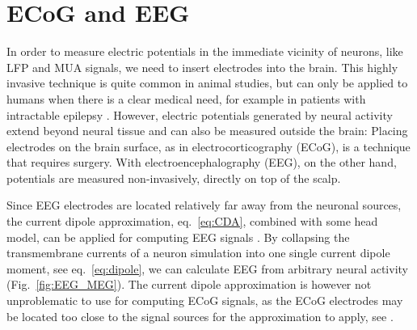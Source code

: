 \documentclass[preprint,11pt,authoryear]{elsarticle}
\newcommand{\hlj}[2][OliveGreen]{ {\sethlcolor{#1} \hl{#2}} }
\newcommand{\hlp}[2][Purple]{ {\sethlcolor{#1} \hl{#2}} }
\newcommand{\tvnnote}[1]{\color{white}{\hlj{TVN: #1 }}\color{black}}
\newcommand{\snnote}[1]{\color{white}{\hlp{SN: #1 }}\color{black}}
\begin{document}
\section{ECoG and EEG}
\label{sec:EEG}
In order to measure electric potentials in the immediate vicinity of neurons, like LFP and MUA signals, we need to insert electrodes into the brain. This highly invasive technique is quite common in animal studies, but can only be applied to humans when there is a clear medical need, for example in patients with intractable epilepsy \citep{Zangiabadi2019}. However, electric potentials generated by neural activity extend beyond neural tissue and can also be measured outside the brain:
Placing electrodes on the brain surface, as in electrocorticography (ECoG), is a technique that requires surgery. With electroencephalography (EEG), on the other hand, potentials are measured non-invasively, directly on top of the scalp.




Since EEG electrodes are located relatively far away from the neuronal sources, the current dipole approximation, eq.~\eqref{eq:CDA}, combined with some head model, can be applied for computing EEG signals \citep{Nunez2006,Ilmoniemi2019}. By collapsing the transmembrane currents of a neuron simulation into one single current dipole moment, see eq.~\eqref{eq:dipole}, we can calculate EEG from arbitrary neural activity (Fig.~\ref{fig:EEG_MEG}).
The current dipole approximation is however not unproblematic to use for computing ECoG signals, as the ECoG electrodes may be located too close to the 
signal sources for the approximation to apply, see \cite{Hagen2018}.
\end{document}
